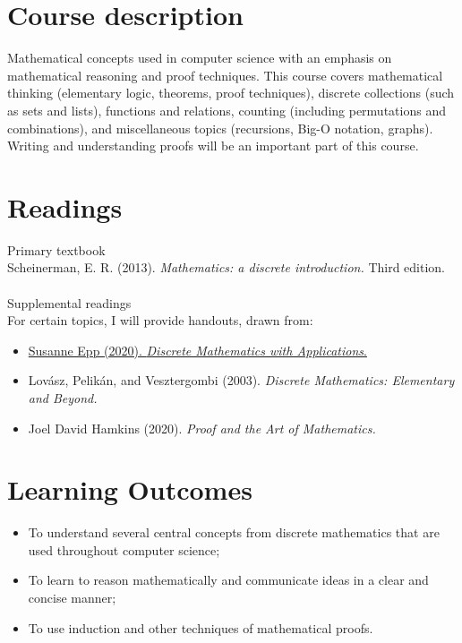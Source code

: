 \documentclass[letterpaper]{inzane_syllabus} %
\begin{document}
\makeprofile %


\section{Course description}

Mathematical concepts used in computer science with an emphasis on mathematical reasoning and proof techniques. This course covers mathematical thinking (elementary logic, theorems, proof techniques), discrete collections (such as sets and lists),  functions and relations,  counting (including permutations and combinations), and miscellaneous topics (recursions, Big-O notation, graphs).  Writing and understanding proofs will be an important part of this course.

\vspace{0.2cm} 
\section{Readings}

{\color{myCOLOR} Primary textbook}\\
Scheinerman, E. R. (2013). \textit{Mathematics: a discrete introduction.} Third edition.\\
\\
{\color{myCOLOR} Supplemental readings}\\ For certain topics, I will provide handouts, drawn from: 
\begin{itemize}
\item \href{https://www.toomey.org/tutor/text_books/Digital_Logic/Discrete%20Mathematics%20with%20Applications%20-%20Susanna%20S.%20Epp%20(2019).pdf}{Susanne Epp (2020).  \textit{Discrete Mathematics with Applications}.} 
\item Lov\'asz, Pelik\'an, and Vesztergombi (2003).  \textit{Discrete Mathematics: Elementary and Beyond.} 
\item Joel David Hamkins (2020). \textit{Proof and the Art of Mathematics.}	
\end{itemize}

\vspace{0.2cm}
\section{Learning Outcomes}

\begin{itemize}
\item To understand several central concepts from discrete mathematics that are used throughout computer science;
\item To learn to reason mathematically and communicate ideas in a clear and concise manner;
\item To use induction and other techniques of mathematical proofs.
\end{itemize}
\end{document}
